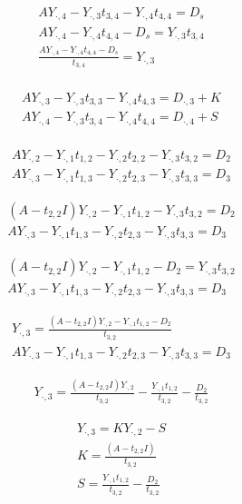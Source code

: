 \documentclass[]{article}
\begin{document}
\begin{gather}
AY_{\cdot,4}  - Y_{\cdot,3}t_{3,4} - Y_{\cdot,4}t_{4,4} = D_s \\
AY_{\cdot,4}  - Y_{\cdot,4}t_{4,4} - D_s = Y_{\cdot,3}t_{3,4} \\
\frac{AY_{\cdot,4}  - Y_{\cdot,4}t_{4,4} - D_s}{t_{3,4}} = Y_{\cdot,3} \\
\end{gather}

\begin{gather}
AY_{\cdot,3}  - Y_{\cdot,3}t_{3,3} - Y_{\cdot,4}t_{4,3} = D_{\cdot,3} + K\\
AY_{\cdot,4}- Y_{\cdot,3}t_{3,4} - Y_{\cdot,4}t_{4,4} = D_{\cdot,4} + S \\
\end{gather}


\begin{gather}
	AY_{\cdot,2} - Y_{\cdot,1}t_{1,2} -	Y_{\cdot,2}t_{2,2} -	Y_{\cdot,3}t_{3,2}= D_{2}\\
	AY_{\cdot,3} -  Y_{\cdot,1}t_{1,3} -	Y_{\cdot,2}t_{2,3} -	Y_{\cdot,3}t_{3,3}= D_{3}
\end{gather}

\begin{gather}
(A-t_{2,2}I)Y_{\cdot,2}- Y_{\cdot,1}t_{1,2} -	Y_{\cdot,3}t_{3,2}= D_{2}\\
AY_{\cdot,3} -  Y_{\cdot,1}t_{1,3} -	Y_{\cdot,2}t_{2,3}-	Y_{\cdot,3}t_{3,3}= D_{3}
\end{gather}

\begin{gather}
(A-t_{2,2}I)Y_{\cdot,2} - Y_{\cdot,1}t_{1,2} - D_{2}= Y_{\cdot,3}t_{3,2}\\
AY_{\cdot,3} -  Y_{\cdot,1}t_{1,3} -	Y_{\cdot,2}t_{2,3} -Y_{\cdot,3}t_{3,3}= D_{3}
\end{gather}

\begin{gather}
Y_{\cdot,3} = \frac{(A-t_{2,2}I)Y_{\cdot,2} - Y_{\cdot,1}t_{1,2} - D_{2}}{t_{3,2}}\\
AY_{\cdot,3} -  Y_{\cdot,1}t_{1,3} -	Y_{\cdot,2}t_{2,3} -	Y_{\cdot,3}t_{3,3}= D_{3}
\end{gather}


\begin{gather}
Y_{\cdot,3} = \frac{(A-t_{2,2}I)Y_{\cdot,2}}{t_{3,2}} - \frac{Y_{\cdot,1}t_{1,2}}{t_{3,2}} -\frac{D_{2}}{t_{3,2}}
\end{gather}

\begin{gather}
Y_{\cdot,3} = KY_{\cdot,2} - S\\
K = \frac{(A-t_{2,2}I)}{t_{3,2}}\\
S=\frac{Y_{\cdot,1}t_{1,2}}{t_{3,2}}-\frac{D_{2}}{t_{3,2}}\\
\end{gather}
\end{document}
